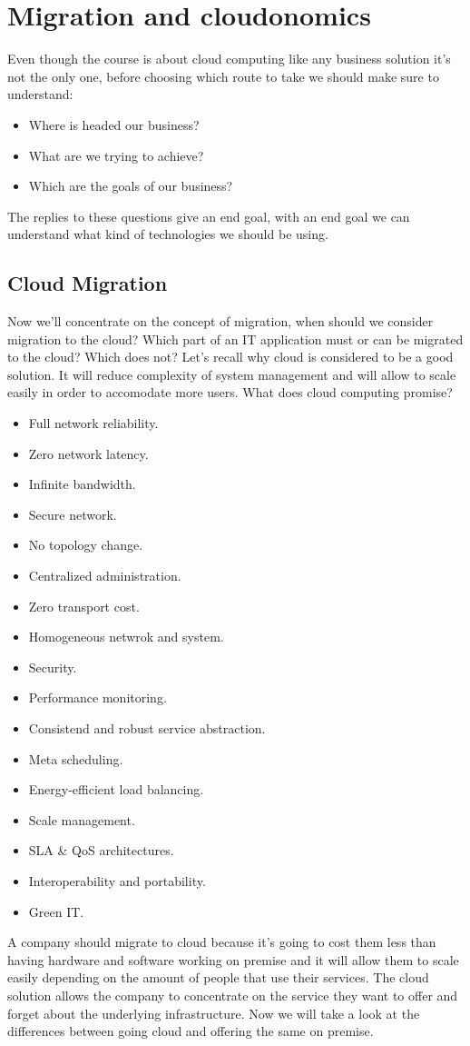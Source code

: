 \chapter{Migration and cloudonomics}
Even though the course is about cloud computing like any business solution it's not the only one, before choosing which route to take we should make sure to understand:
\begin{itemize}
    \item Where is headed our business?
    \item What are we trying to achieve?
    \item Which are the goals of our business?
\end{itemize}
The replies to these questions give an end goal, with an end goal we can understand what kind of technologies we should be using.
\section{Cloud Migration}
Now we'll concentrate on the concept of migration, when should we consider migration to the cloud? Which part of an IT application must or can be migrated to the cloud? Which does not? \n
Let's recall why cloud is considered to be a good solution. It will reduce complexity of system management and will allow to scale easily in order to accomodate more users. \n
What does cloud computing promise?
\begin{itemize}
    \item Full network reliability.
    \item Zero network latency.
    \item Infinite bandwidth.
    \item Secure network.
    \item No topology change.
    \item Centralized administration.
    \item Zero transport cost.
    \item Homogeneous netwrok and system.
    \item Security.
    \item Performance monitoring.
    \item Consistend and robust service abstraction.
    \item Meta scheduling.
    \item Energy-efficient load balancing.
    \item Scale management.
    \item SLA \& QoS architectures.
    \item Interoperability and portability.
    \item Green IT.
\end{itemize}
A company should migrate to cloud because it's going to cost them less than having hardware and software working on premise and it will allow them to scale easily depending on the amount of people that use their services. \n 
The cloud solution allows the company to concentrate on the service they want to offer and forget about the underlying infrastructure. Now we will take a look at the differences between going cloud and offering the same on premise.
